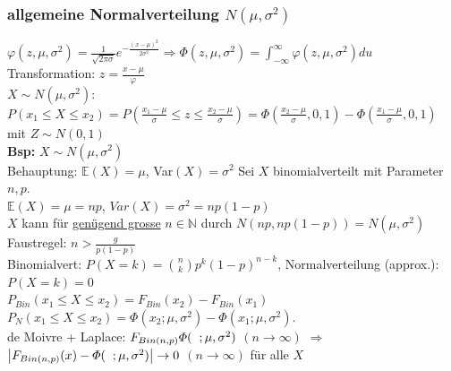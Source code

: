 \documentclass[a4paper,10pt]{article}
\newcommand{\NN}{\mathbb{N}} %
\newcommand{\EN}{\mathbb{E}}
\newcommand{\Bold}[1]{\textbf{#1}} %
\newcommand{\Ra}{\Rightarrow}
\newcommand{\Abs}[1]{\left| #1 \right|} %
\newcommand{\Oneover}[1]{\frac{1}{#1}} %
\begin{document}
\subsubsection{allgemeine Normalverteilung $N(\mu,\sigma^2)$}
$\varphi(z,\mu,\sigma^2)=\Oneover{\sqrt{2\pi\sigma}}e^{-\frac{(x-\mu)^2}{2\sigma^2}}\Ra\varPhi(z,\mu,\sigma^2)=\int_{-\infty}^{\infty}\varphi(z,\mu,\sigma^2)du$\\
Transformation: $z=\frac{x-\mu}{\varphi}$\\
$X\sim N(\mu,\sigma^2)$: $P(x_1\leq X\leq x_2)=P(\frac{x_1-\mu}{\sigma}\leq z\leq\frac{x_2-\mu}{\sigma})=\varPhi(\frac{x_2-\mu}{\sigma},0,1)-\varPhi(\frac{x_1-\mu}{\sigma},0,1)$ mit $Z\sim N(0,1)$\\
\Bold{Bsp:} $X\sim N(\mu,\sigma^2)$\\
Behauptung: $\EN(X)=\mu$, Var$(X)=\sigma^2$
Sei $X$ binomialverteilt mit Parameter $n,p$.\\
$\EN(X)=\mu=np$, $Var(X)=\sigma^2=np(1-p)$\\
$X$ kann für \underline{genügend grosse} $n\in\NN$ durch $N(np,np(1-p))=N(\mu,\sigma^2)$\\
Faustregel: $n>\frac{g}{p(1-p)}$\\
Binomialvert: $P(X=k)={n\choose k}p^k(1-p)^{n-k}$, Normalverteilung (approx.): $P(X=k)=0$\\
$P_{Bin}(x_1\leq X\leq x_2)=F_{Bin}(x_2)-F_{Bin}(x_1)$\\
$P_N(x_1\leq X\leq x_2)=\varPhi(x_2;\mu,\sigma^2)-\varPhi(x_1;\mu,\sigma^2)$.\\
de Moivre + Laplace: $F_{Bin(n,p)}\varPhi(\hspace{0.2cm};\mu,\sigma^2)$ $(n\to\infty)$ $\Ra$ $\Abs{F_{Bin(n,p)}(x)-\varPhi(\hspace{0.2cm};\mu,\sigma^2)}\to0$ $(n\to\infty)$ für alle $X$
\end{document}
